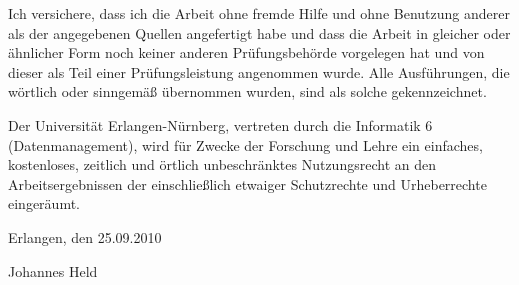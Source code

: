 \thispagestyle{empty}
Ich versichere, dass ich die Arbeit ohne fremde Hilfe und ohne Benutzung anderer als der angegebenen Quellen angefertigt habe und dass die Arbeit in gleicher oder ähnlicher Form noch keiner anderen Prüfungsbehörde vorgelegen hat und von dieser als Teil einer Prüfungsleistung angenommen wurde. Alle Ausführungen, die wörtlich oder sinngemäß übernommen wurden, sind als solche gekennzeichnet.
\vspace{2cm}

Der Universität Erlangen-Nürnberg, vertreten durch die Informatik 6 (Datenmanagement), wird für Zwecke der Forschung und Lehre ein einfaches, kostenloses, zeitlich und örtlich unbeschränktes Nutzungsrecht an den Arbeitsergebnissen der \thethesis einschließlich etwaiger Schutzrechte und Urheberrechte eingeräumt.

\vspace{2cm}
Erlangen, den 25.09.2010

\vspace{2cm}
Johannes Held \hfill \ 

\vspace{0,5cm}

\clearpage{\pagestyle{empty}\cleardoublepage}
